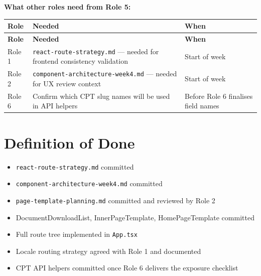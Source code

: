 \documentclass[12pt,a4paper]{article}
\begin{document}
\vspace{0.8em}
\noindent\textbf{What other roles need from Role 5:}

\vspace{0.5em}
\begin{longtable}{@{}p{2cm}p{6.5cm}p{3.8cm}@{}}
\toprule
\rowcolor{uvtLightBlue}
\textbf{Role} & \textbf{Needed} & \textbf{When} \\
\midrule
\endfirsthead
\toprule
\rowcolor{uvtLightBlue}
\textbf{Role} & \textbf{Needed} & \textbf{When} \\
\midrule
\endhead
\bottomrule
\endfoot
Role 1 & \texttt{react-route-strategy.md} --- needed for frontend consistency validation & Start of week \\
Role 2 & \texttt{component-architecture-week4.md} --- needed for UX review context & Start of week \\
Role 6 & Confirm which CPT slug names will be used in API helpers & Before Role 6 finalises field names \\
\end{longtable}

\section{Definition of Done}

\begin{itemize}
    \item[$\square$] \texttt{react-route-strategy.md} committed
    \item[$\square$] \texttt{component-architecture-week4.md} committed
    \item[$\square$] \texttt{page-template-planning.md} committed and reviewed by Role 2
    \item[$\square$] DocumentDownloadList, InnerPageTemplate, HomePageTemplate committed
    \item[$\square$] Full route tree implemented in \texttt{App.tsx}
    \item[$\square$] Locale routing strategy agreed with Role 1 and documented
    \item[$\square$] CPT API helpers committed once Role 6 delivers the exposure checklist
\end{itemize}
\end{document}
